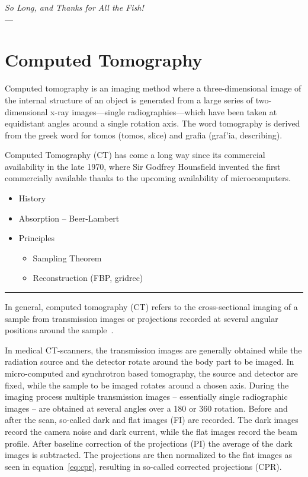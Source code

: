 \label{ch:ct}
\begin{flushright}{\slshape    
		So Long, and Thanks for All the Fish!} \\ \medskip
    ---  \citep{Adams1984}
\end{flushright}
\bigskip

\section{Computed Tomography}
Computed tomography is an imaging method where a three-dimensional image of the internal structure of an object is generated from a large series of two-dimensional x-ray images---single radiographies---which have been taken at equidistant angles
around a single rotation axis. The word tomography is derived from the greek word for tomos (\greektext tomos\latintext, slice) and grafia (\greektext graf'ia\latintext, describing).

Computed Tomography (\acs{CT}) has come a long way since its commercial availability in the late 1970, where Sir Godfrey Hounsfield invented the first commercially available thanks to the upcoming availability of microcomputers.

\begin{itemize}
    \item History
    \item Absorption -- Beer-Lambert
    \item Principles
    \begin{itemize}
        \item Sampling Theorem
        \item Reconstruction (FBP, gridrec)
    \end{itemize}
\end{itemize}

\hrule

In general, computed tomography (CT) refers to the cross-sectional imaging of a sample from transmission images or projections recorded at several angular positions around the sample~\cite{Kak2002}.

In medical CT-scanners, the transmission images are generally obtained while the radiation source and the detector rotate around the body part to be imaged. In micro-computed and synchrotron based tomography, the source and detector are fixed, while the sample to be imaged rotates around a chosen axis. During the imaging process multiple transmission images -- essentially single radiographic images -- are obtained at several angles over a \unit{180}{\degree} or \unit{360}{\degree} rotation. Before and after the scan, so-called dark and flat images (FI) are recorded. The dark images record the camera noise and dark current, while the flat images record the beam profile. After baseline correction of the projections (PI) the average of the dark images is subtracted. The projections are then normalized to the flat images as seen in equation~\ref{eq:cpr}, resulting in so-called corrected projections (CPR).

